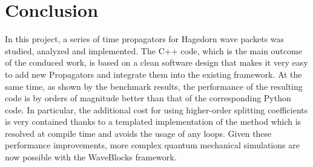 \section{Conclusion}
%
In this project, a series of time propagators for Hagedorn wave packets was studied, analyzed and implemented.
The C++ code, which is the main outcome of the conduced work, is based on a clean software design that makes it very easy to add new Propagators and integrate them into the existing framework.
At the same time, as shown by the benchmark results, the performance of the resulting code is by orders of magnitude better than that of the corresponding Python code.
In particular, the additional cost for using higher-order splitting coefficients is very contained thanks to a templated implementation of the  method which is resolved at compile time and avoids the usage of any loops.
Given these performance improvements, more complex quantum mechanical simulations are now possible with the WaveBlocks framework.
